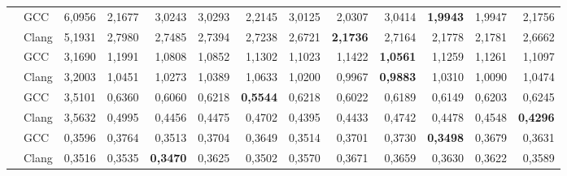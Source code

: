 \begin{table}[H]
\begin{tabular}{llrrrrrrrrrrr}
\addlinespace
\multirow{2}{*}{radix4\_naive}
  & GCC   & 6,0956 & 2,1677 & 3,0243 & 3,0293 & 2,2145 & 3,0125 & 2,0307 & 3,0414 & \textbf{1,9943} & 1,9947 & 2,1756 \\
  & Clang & 5,1931 & 2,7980 & 2,7485 & 2,7394 & 2,7238 & 2,6721 & \textbf{2,1736} & 2,7164 & 2,1778 & 2,1781 & 2,6662 \\
\addlinespace
\multirow{2}{*}{splitradix}
  & GCC   & 3,1690 & 1,1991 & 1,0808 & 1,0852 & 1,1302 & 1,1023 & 1,1422 & \textbf{1,0561} & 1,1259 & 1,1261 & 1,1097 \\
  & Clang & 3,2003 & 1,0451 & 1,0273 & 1,0389 & 1,0633 & 1,0200 & 0,9967 & \textbf{0,9883} & 1,0310 & 1,0090 & 1,0474 \\
\addlinespace
\multirow{2}{*}{stockham}
  & GCC   & 3,5101 & 0,6360 & 0,6060 & 0,6218 & \textbf{0,5544} & 0,6218 & 0,6022 & 0,6189 & 0,6149 & 0,6203 & 0,6245 \\
  & Clang & 3,5632 & 0,4995 & 0,4456 & 0,4475 & 0,4702 & 0,4395 & 0,4433 & 0,4742 & 0,4478 & 0,4548 & \textbf{0,4296} \\
\addlinespace
\multirow{2}{*}{fftw}
  & GCC   & 0,3596 & 0,3764 & 0,3513 & 0,3704 & 0,3649 & 0,3514 & 0,3701 & 0,3730 & \textbf{0,3498} & 0,3679 & 0,3631 \\
  & Clang & 0,3516 & 0,3535 & \textbf{0,3470} & 0,3625 & 0,3502 & 0,3570 & 0,3671 & 0,3659 & 0,3630 & 0,3622 & 0,3589 \\
\bottomrule
\end{tabular}
\end{table}



